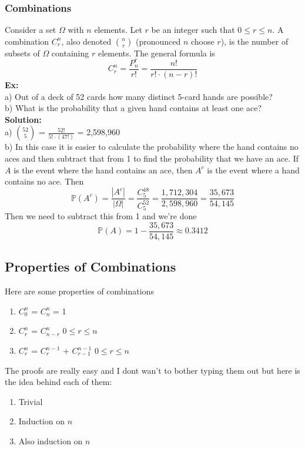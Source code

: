 \documentclass{article}
\newcommand{\bbP}{\mathbb{P}}
\newcommand{\Om}{\Omega}
\begin{document}
\subsubsection{Combinations}
Consider a set $\Om$ with $n$ elements. Let $r$ be an integer such that $0 \leq r \leq n$. A combination $C^{n}_{r}$, also denoted ${n}\choose{r}$ (pronounced $n$ choose $r$), is the number of subsets of $\Om$ containing $r$ elements. The general formula is
\[C^{n}_{r} = \frac{P_{n}^{r}}{r!} = \frac{n!}{r! \cdot (n-r)!}\]
\textbf{Ex:}\\
a) Out of a deck of 52 cards how many distinct 5-card hands are possible?\\
b) What is the probability that a given hand contains at least one ace?\\
\textbf{Solution:}\\
a) ${52}\choose{5}$ = $\frac{52!}{5! \cdot (47!)}$ = 2,598,960\\
b) In this case it is easier to calculate the probability where the hand contains no aces and then subtract that from 1 to find the probability that we have an ace. If $A$ is the event where the hand contains an ace, then $A^{c}$ is the event where a hand contains no ace. Then
\[\bbP(A^{c}) =  \frac{|A^{c}|}{|\Om|} = \frac{C^{48}_{5}}{C^{52}_{5}} = \frac{1,712,304}{2,598,960} = \frac{35,673}{54,145}\]
Then we need to subtract this from 1 and we're done
\[\bbP(A) = 1 - \frac{35,673}{54,145} \approx 0.3412\]
\subsection{Properties of Combinations}
Here are some properties of combinations
\begin{enumerate}
	\item $C^{n}_{0}$ = $C^{n}_{n}$ = 1
	\item $C^{n}_{r}$ = $C^{n}_{n-r}$ $0 \leq r \leq n$
	\item $C^{n}_{r}$ = $C^{n-1}_{r}$ + $C^{n-1}_{r-1}$ $0 \leq r \leq n$
\end{enumerate}
The proofs are really easy and I dont wan't to bother typing them out but here is the idea behind each of them:
\begin{enumerate}
	\item Trivial
	\item Induction on $n$
	\item Also induction on $n$
\end{enumerate}
\end{document}
